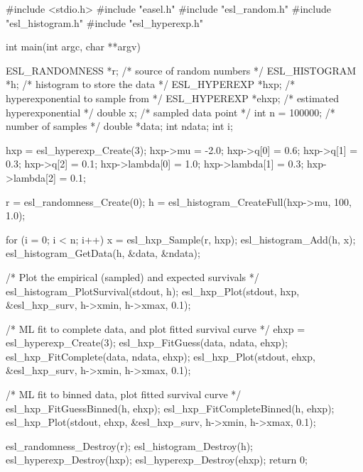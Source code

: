 \begin{cchunk}
#include <stdio.h>
#include "easel.h"
#include "esl_random.h"
#include "esl_histogram.h"
#include "esl_hyperexp.h"

int
main(int argc, char **argv)
{
  ESL_RANDOMNESS *r;		/* source of random numbers        */
  ESL_HISTOGRAM  *h;		/* histogram to store the data     */
  ESL_HYPEREXP   *hxp;		/* hyperexponential to sample from */
  ESL_HYPEREXP   *ehxp;		/* estimated hyperexponential      */
  double      x;		/* sampled data point              */
  int         n = 100000;	/* number of samples               */
  double     *data;
  int         ndata;
  int         i;

  hxp = esl_hyperexp_Create(3);
  hxp->mu = -2.0;
  hxp->q[0]      = 0.6;    hxp->q[1]      = 0.3;   hxp->q[2]      = 0.1; 
  hxp->lambda[0] = 1.0;    hxp->lambda[1] = 0.3;   hxp->lambda[2] = 0.1;

  r   = esl_randomness_Create(0);
  h   = esl_histogram_CreateFull(hxp->mu, 100, 1.0);

  for (i = 0; i < n; i++)
    {
      x    = esl_hxp_Sample(r, hxp);
      esl_histogram_Add(h, x);
    }
  esl_histogram_GetData(h, &data, &ndata);

  /* Plot the empirical (sampled) and expected survivals */
  esl_histogram_PlotSurvival(stdout, h);
  esl_hxp_Plot(stdout, hxp, &esl_hxp_surv, h->xmin, h->xmax, 0.1);

  /* ML fit to complete data, and plot fitted survival curve */
  ehxp = esl_hyperexp_Create(3);
  esl_hxp_FitGuess(data, ndata, ehxp);
  esl_hxp_FitComplete(data, ndata, ehxp);
  esl_hxp_Plot(stdout, ehxp, &esl_hxp_surv,  h->xmin, h->xmax, 0.1);

  /* ML fit to binned data, plot fitted survival curve  */
  esl_hxp_FitGuessBinned(h, ehxp);
  esl_hxp_FitCompleteBinned(h, ehxp);
  esl_hxp_Plot(stdout, ehxp, &esl_hxp_surv,  h->xmin, h->xmax, 0.1);

  esl_randomness_Destroy(r);
  esl_histogram_Destroy(h);
  esl_hyperexp_Destroy(hxp);
  esl_hyperexp_Destroy(ehxp);
  return 0;
}
\end{cchunk}
